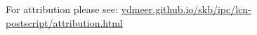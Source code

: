 \doclicenseThis

{
\vspace{1cm}
\setlength{\parindent}{0pt}
For attribution please see:
    \href{https://vdmeer.github.io/skb/ipc/lcn-postscript/attribution.html}{vdmeer.github.io/skb/ipc/lcn-postscript/attribution.html}
}
